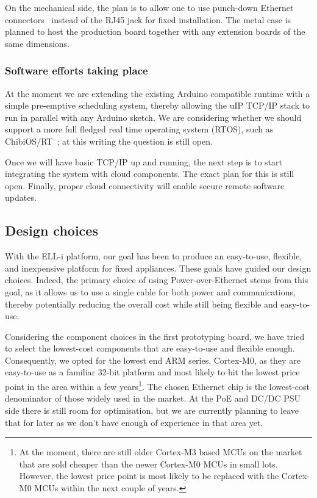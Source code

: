 \documentclass[draft,a4paper]{siamltex}
\begin{document}
On the mechanical side, the plan is to allow one to use
punch-down Ethernet connectors~\cite{Krone} instead of the RJ45 jack
for fixed installation.  The metal case is planned to host the
production board together with any extension boards of the same
dimensions.

\subsubsection{Software efforts taking place}

At the moment we are extending the existing Arduino compatible runtime
with a simple pre-emptive scheduling system, thereby allowing the uIP
TCP/IP stack to run in parallel with any Arduino sketch.  We are
considering whether we should support a more full fledged real time
operating system (RTOS), such as ChibiOS/RT~\cite{ChibiOS}; at this
writing the question is still open.

Once we will have basic TCP/IP up and running, the next step is to
start integrating the system with cloud components.  The exact plan
for this is still open.  Finally, proper cloud connectivity will
enable secure remote software updates.

\subsection{Design choices}


With the ELL-i platform, our goal has been to produce an easy-to-use,
flexible, and inexpensive platform for fixed appliances.  These goals
have guided our design choices.  Indeed, the primary choice of using
Power-over-Ethernet stems from this goal, as it allows us to use a
single cable for both power and communications, thereby potentially
reducing the overall cost while still being flexible and easy-to-use.

Considering the component choices in the first prototyping board, we
have tried to select the lowest-cost components that are easy-to-use
and flexible enough.  Consequently, we opted for the lowest end ARM
series, Cortex-M0, as they are easy-to-use as a familiar 32-bit
platform and most likely to hit the lowest price point in the area
within a few years\footnote{At the moment, there are still older
  Cortex-M3 based MCUs on the market that are sold cheaper than the
  newer Cortex-M0 MCUs in small lots.  However, the lowest price
  point is most likely to be replaced with the Cortex-M0 MCUs within
  the next couple of years.}.
The chosen Ethernet chip is the lowest-cost denominator of those
widely used in the market.  At the PoE and DC/DC PSU side there is
still room for optimisation, but we are currently planning to leave
that for later as we don't have enough of experience in that area yet.
\end{document}
